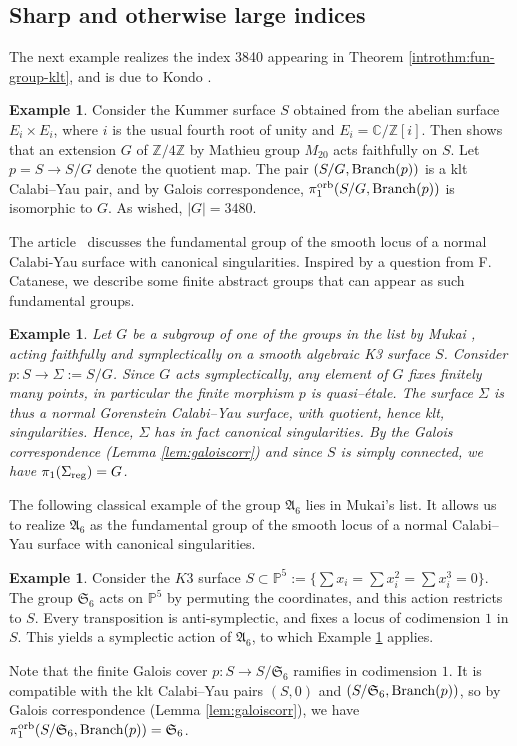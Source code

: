 \documentclass{amsart}
\newcommand{\zz}{\mathbb{Z}}
\newcommand{\cc}{\mathbb{C}}
\theoremstyle{definition}
\newtheorem{example}[theorem]{Example}
\theoremstyle{remark}
\numberwithin{equation}{section}
\begin{document}
\subsection{Sharp and otherwise large indices}

The next example realizes the index 3840 appearing in Theorem \ref{introthm:fun-group-klt}, and is due to Kondo \cite{Kondo99}.

\begin{example}\label{ex:kondo}
    Consider the Kummer surface $S$ obtained from the abelian surface $E_i\times E_i$, where $i$ is the usual fourth root of unity and $E_i=\cc/\zz[i]$. Then \cite[Lemma 1.2]{Kondo99} shows that an extension $G$ of $\zz/4\zz$ by Mathieu group $M_{20}$ acts faithfully on $S$. Let $p=S\to S/G$ denote the quotient map. 
    The pair $(S/G,{\rm Branch}(p))$ is a klt Calabi--Yau pair, and by Galois correspondence, $\pi_1^{\rm orb}(S/G,{\rm Branch}(p))$ is isomorphic to $G$. As wished, $|G|=3480$.
\end{example}

The article~\cite{CKO03} discusses the fundamental group of the smooth locus of a normal Calabi-Yau surface with canonical singularities. Inspired by a question from F. Catanese, we describe some finite abstract groups that can appear as such fundamental groups.

\begin{example}\label{ex:mukai}
{\em
    Let $G$ be a subgroup of one of the groups in the list by Mukai \cite{Mukai88}, acting faithfully and symplectically on a smooth algebraic K3 surface $S$.
    Consider $p:S \to  \Sigma := S/G$. Since $G$ acts symplectically, any element of $G$ fixes finitely many points, in particular the finite morphism $p$ is quasi--\'etale. The surface $\Sigma$ is thus a normal Gorenstein Calabi--Yau surface, with quotient, hence klt, singularities. Hence, $\Sigma$ has in fact canonical singularities.
    By the Galois correspondence (Lemma \ref{lem:galoiscorr}) and since $S$ is simply connected, we have $\pi_1(\Sigma_{\rm reg})=G$.
}
\end{example}

The following classical example of the group $\mathfrak{A}_6$ lies in Mukai's list. It allows us to realize $\mathfrak{A}_6$ as the fundamental group of the smooth locus of a normal Calabi--Yau surface with canonical singularities.

\begin{example}
 Consider the $K3$ surface $S\subset\mathbb{P}^5:=\{\sum x_i=\sum x_i^2=\sum x_i^3=0\}$. The group $\mathfrak{S}_6$ acts on $\mathbb{P}^5$ by permuting the coordinates, and this action restricts to $S$. Every transposition is anti-symplectic, and fixes a locus of codimension $1$ in $S$. This yields a symplectic action of $\mathfrak{A}_6$, to which Example \ref{ex:mukai} applies.

Note that the finite Galois cover $p:S\to S/\mathfrak{S}_6$ ramifies in codimension $1$. It is compatible with the klt Calabi--Yau pairs $(S,0)$ and $(S/\mathfrak{S}_6,{\rm Branch}(p))$, so by Galois correspondence (Lemma \ref{lem:galoiscorr}), we have $\pi_1^{\rm orb}(S/\mathfrak{S}_6,{\rm Branch}(p))=\mathfrak{S}_6$.
\end{example}
\end{document}
